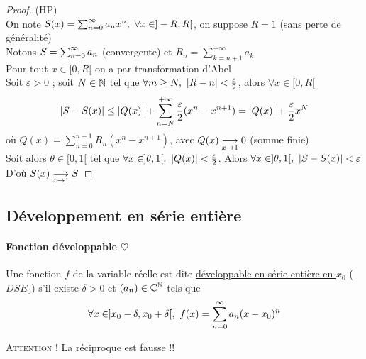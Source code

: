 		\begin{proof} (HP)\\
		On note $S(x) = \sum_{n=0}^\infty a_nx^n ,~\forall x\in ]-R,R[$, on suppose $R=1$ (sans perte de généralité)\\
		Notons $S=\sum_{n=0}^\infty a_n$ (convergente) et $R_n = \sum_{k=n+1}^{+\infty} a_k$\\
		Pour tout $x\in[0,R[$ on a par transformation d'Abel \vspace*{0.3cm}\\
		Soit $\varepsilon >0$ ; soit $N\in{\mathbb{N}}$ tel que $\forall m\geq N ,~\left\vert R-n \right\vert<\frac{\varepsilon}{2}$, alors $\forall x\in[0,R[$ 
		\[ \left\vert S-S(x) \right\vert \leq \left\vert Q(x) \right\vert + \sum_{n=N}^{+\infty} \frac{\varepsilon}{2} (x^n - x^{n+1}) = \left\vert Q(x) \right\vert + \frac{\varepsilon}{2} x^N \] 
		où $Q(x) = \sum_{n=0}^{n-1} R_n(x^n - x^{n+1})$, avec $Q(x) \underset{x \to 1}{\longrightarrow} 0$ (somme finie) \vspace*{0.2cm} \\
		Soit alors $\theta \in [0,1[$ tel que $\forall x\in ]\theta,1[ ,~ \left\vert Q(x) \right\vert <\frac{\varepsilon}{2}$. Alors $\forall x\in ]\theta,1[,~ \left\vert S-S(x) \right\vert <\varepsilon$ \vspace*{0.2cm} \\
		D'où $S(x) \underset{x \to 1}{\longrightarrow} S$
		\end{proof} \medskip
		
		
	\subsection{Développement en série entière}
		
		\vspace{-15pt}
		\traitd
		\paragraph{Fonction développable $\heartsuit$}
			Une fonction $f$ de la variable réelle est dite \uline{développable en série entière en $x_0$} ($DSE_0$) s'il existe $\delta>0$ et $(a_n)\in{\mathbb{C}}^{\mathbb{N}}$ tels que 
			\[ 
				\forall x\in ]x_0-\delta , x_0+\delta[ ,~ f(x) = \suminf a_n(x-x_0)^n 
			\vspace{-15pt}
			\]
		\trait
		
		 \medskip
		
		\textsc{Attention !} La réciproque est fausse !! 
		
